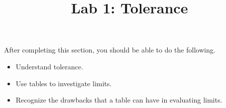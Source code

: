 \documentclass{ximera}
\title{Lab 1: Tolerance}
\begin{document}
\begin{abstract}
\end{abstract}

\maketitle

\begin{sectionOutcomes}

After completing this section, you should be able to do the following.

\begin{itemize}
	\item Understand tolerance.
    \item Use tables to investigate limits.
    \item Recognize the drawbacks that a table can have in evaluating limits.
\end{itemize}
\end{sectionOutcomes}
\end{document}
